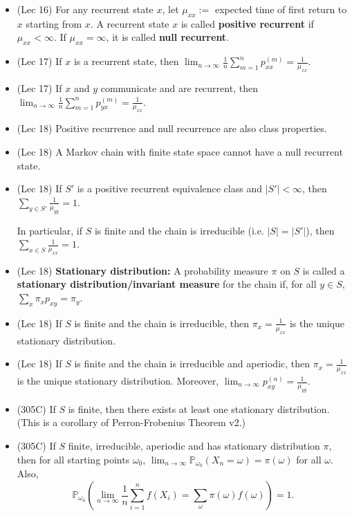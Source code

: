 \documentclass[twoside]{article}
\newcommand{\dis}{\displaystyle}
\newcommand\bbP{\mathbb{P}}
\newcommand\om{\omega}
\newcommand\goesto{\rightarrow}
\begin{document}
\begin{itemize}
\item (Lec 16) For any recurrent state $x$, let $\mu_{xx} :=$ expected time of first return to $x$ starting from $x$. A recurrent state $x$ is called \textbf{positive recurrent} if $\mu_{xx} < \infty$. If $\mu_{xx} = \infty$, it is called \textbf{null recurrent}.

\item (Lec 17) If $x$ is a recurrent state, then 
$\dis\lim_{n \goesto \infty} \frac{1}{n} \sum_{m=1}^n p_{xx}^{(m)} = \frac{1}{\mu_{xx}}$.

\item (Lec 17) If $x$ and $y$ communicate and are recurrent, then $\dis\lim_{n \goesto \infty} \frac{1}{n} \sum_{m=1}^n p_{yx}^{(m)} = \frac{1}{\mu_{xx}}$.

\item (Lec 18) Positive recurrence and null recurrence are also class properties.

\item (Lec 18) A Markov chain with finite state space cannot have a null recurrent state.

\item (Lec 18) If $S'$ is a positive recurrent equivalence class and $|S'| < \infty$, then $\dis\sum_{y \in S'} \frac{1}{\mu_{yy}} = 1$.

In particular, if $S$ is finite and the chain is irreducible (i.e. $|S| = |S'|$), then $\dis\sum_{x \in S} \frac{1}{\mu_{xx}} = 1$.

\item (Lec 18) \textbf{Stationary distribution:} A probability measure $\pi$ on $S$ is called a \textbf{stationary distribution/invariant measure} for the chain if, for all $y \in S$, $\dis\sum_{x} \pi_x p_{xy} = \pi_y$.

\item (Lec 18) If $S$ is finite and the chain is irreducible, then $\pi_x = \dis\frac{1}{\mu_{xx}}$ is the unique stationary distribution.

\item (Lec 18) If $S$ is finite and the chain is irreducible and aperiodic, then $\pi_x = \dis\frac{1}{\mu_{xx}}$ is the unique stationary distribution. Moreover, $\dis\lim_{n \rightarrow \infty} p_{xy}^{(n)} = \frac{1}{\mu_{yy}}$.

\item (305C) If $S$ is finite, then there exists at least one stationary distribution. (This is a corollary of Perron-Frobenius Theorem v2.)

\item (305C) If $S$ finite, irreducible, aperiodic and has stationary distribution $\pi$, then for all starting points $\om_0$, $\dis\lim_{n \goesto \infty} \bbP_{\om_0}(X_n = \om) = \pi(\om)$ for all $\om$. Also,
\begin{equation*}
\bbP_{\om_0} \left(\lim_{n \goesto \infty} \frac{1}{n}\sum_{i=1}^n f(X_i) = \sum_\om \pi(\om) f(\om) \right) = 1.
\end{equation*}

\end{itemize}
\end{document}
